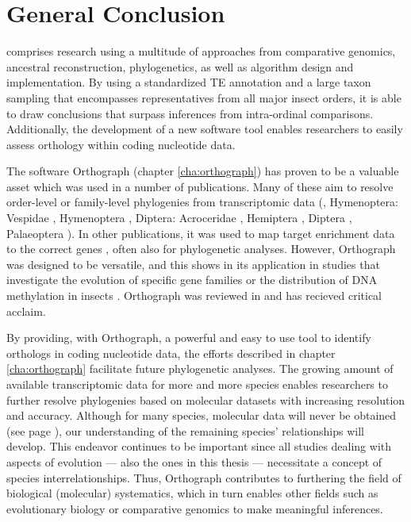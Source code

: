 \chapter{General Conclusion}
\label{cha:general-conclusion}

 comprises research using a multitude of
approaches from comparative genomics, ancestral reconstruction,
phylogenetics, as well as algorithm design and implementation. By using
a standardized TE annotation and a large taxon sampling that encompasses
representatives from all major insect orders, it is able to draw
conclusions that surpass inferences from intra-ordinal comparisons.
Additionally, the development of a new software tool enables researchers
to easily assess orthology within coding nucleotide data.

The software Orthograph (chapter \ref{cha:orthograph}) has proven to be
a valuable asset which was used in a number of publications. Many of
these aim to resolve order-level or family-level phylogenies from
transcriptomic data (\eg, Hymenoptera: Vespidae \citep{Bank2017},
Hymenoptera \citep{Peters2017}, Diptera: Acroceridae
\citep{Gillung2018}, Hemiptera \citep{Johnson2018}, Diptera
\citep{Kutty2018}, Palaeoptera \citep{Simon2018}). In other
publications, it was used to map target enrichment data to the correct
genes \citep{Mayer2016, Sann2018, Shin2018}, often also for phylogenetic
analyses. However, Orthograph was designed to be versatile, and this
shows in its application in studies that investigate the evolution of
specific gene families \citep{Pauli2016, Dowling2017} or the
distribution of DNA methylation in insects \citep{Provataris2018}.
Orthograph was reviewed in \citet{Nichio2017} and has recieved critical
acclaim.

By providing, with Orthograph, a powerful and easy to use tool to
identify orthologs in coding nucleotide data, the efforts described in
chapter \ref{cha:orthograph} facilitate future phylogenetic analyses.
The growing amount of available transcriptomic data for more and more
species enables researchers to further resolve phylogenies based on
molecular datasets with increasing resolution and accuracy. Although for
many species, molecular data will never be obtained (see page
\pageref{mass-extinction}), our understanding of the remaining species'
relationships will develop. This endeavor continues to be important
since all studies dealing with aspects of evolution --- also the ones in
this thesis --- necessitate a concept of species interrelationships.
Thus, Orthograph contributes to furthering the field of biological
(molecular) systematics, which in turn enables other fields such as
evolutionary biology or comparative genomics to make meaningful
inferences.

